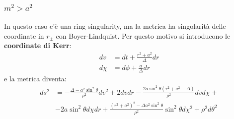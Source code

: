 \subsubsection{$m^2 > a^2$}
In questo caso c'è una ring singularity, ma la metrica ha singolarità delle coordinate in $r_\pm$ con Boyer-Lindquist. Per questo motivo si introducono le \textbf{coordinate di Kerr}:
\begin{align*}
    dv &= dt + \frac{r^2 + a^2}{\Delta} dr\\
    d\chi &= d\phi + \frac{a}{\Delta}dr
\end{align*}
e la metrica diventa:
\begin{align}
    ds^2 &= - \frac{\Delta - a^2\sin^2\theta}{\rho^2}dv^2 + 2dvdr - \frac{2a\sin^2\theta(r^2 + a^2 - \Delta)}{\rho^2}dvd\chi + \nonumber \\ &- 2a\sin^2\theta d\chi dr + \frac{(r^2 + a^2)^2 - \Delta a^2\sin^2\theta}{\rho^2}\sin^2\theta d\chi^2 + \rho^2 d\theta^2
\label{eq.metrica_kerr_coord_kerr}
\end{align}

